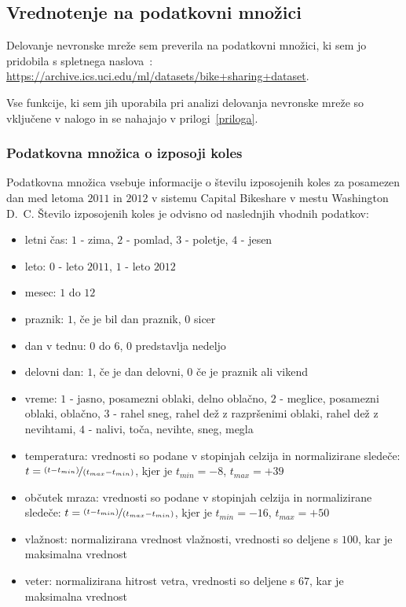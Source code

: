\documentclass[mat1]{fmfdelo}
\begin{document}
\subsection{Vrednotenje na podatkovni množici}
Delovanje nevronske mreže sem preverila na podatkovni množici, ki sem jo pridobila s spletnega naslova~\cite{kolesa}:  \url{https://archive.ics.uci.edu/ml/datasets/bike+sharing+dataset}.

 Vse fun\-kci\-je, ki sem jih uporabila pri analizi delovanja nevronske mreže so vključene v nalogo in se nahajajo v prilogi~\ref{priloga}.
%
\subsubsection{Podatkovna množica o izposoji koles}
Podatkovna množica vsebuje informacije o številu izposojenih koles za posamezen dan med letoma $2011$ in $2012$ v sistemu Capital Bikeshare v mestu Washington D.~C. Število izposojenih koles je odvisno od naslednjih vhodnih podatkov: 
\begin{itemize}
	\item letni čas: $1$ - zima, $2$ - pomlad, $3$ - poletje, $4$ - jesen
	\item leto: $0$ - leto $2011$, $1$ - leto $2012$
	\item mesec: $1$ do $12$
	\item praznik: $1$, če je bil dan praznik, $0$ sicer
	\item dan v tednu: $0$ do $6$, $0$ predstavlja nedeljo
	\item delovni dan: $1$, če je dan delovni, $0$ če je praznik ali vikend
	\item vreme: $1$ - jasno, posamezni oblaki, delno oblačno, $2$ - meglice, posamezni oblaki, oblačno,  $3$ - rahel sneg, rahel dež z razpršenimi oblaki, rahel dež z nevihtami, $4$ - nalivi, toča, nevihte, sneg, megla
	\item temperatura: vrednosti so podane v stopinjah celzija in normalizirane sledeče: $t=\nicefrac{(t-t_{min})}{(t_{max}-t_{min})}$, kjer je $t_{min}=-8$, $t_{max}=+39$
	\item občutek mraza: vrednosti so podane v stopinjah celzija in normalizirane sledeče: $t=\nicefrac{(t-t_{min})}{(t_{max}-t_{min})}$, kjer je $t_{min}=-16$, $t_{max}=+50$
	\item vlažnost: normalizirana vrednost vlažnosti, vrednosti so deljene s $100$, kar je maksimalna vrednost
	\item veter: normalizirana hitrost vetra, vrednosti so deljene s $67$, kar je maksimalna vrednost
\end{itemize}
\end{document}
